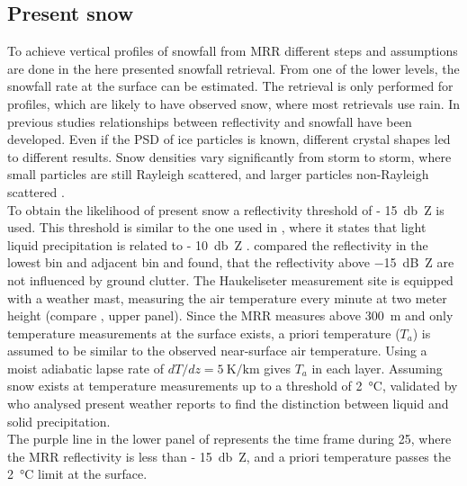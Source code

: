 \subsection{Present snow}\label{sec:pre_snow}

To achieve vertical profiles of snowfall from MRR different steps and assumptions are done in the here presented snowfall retrieval. From one of the lower levels, the snowfall rate at the surface can be estimated. The retrieval is only performed for profiles, which are likely to have observed snow, where most retrievals use rain. In previous studies relationships between reflectivity and snowfall have been developed. Even if the PSD of ice particles is known, different crystal shapes led to different results. Snow densities vary significantly from storm to storm, where small particles are still Rayleigh scattered, and larger particles non-Rayleigh scattered \citep{gunn_microwave_1954}. 
\\
To obtain the likelihood of present snow a reflectivity threshold of \SI{- 15}{\decibel Z} is used. This threshold is similar to the one used in \cite{wood_level_2013}, where it states that light liquid precipitation is related to \SI{- 10}{\decibel Z} \citep{stephens_properties_2007}. \cite{wood_estimation_2011} compared the reflectivity in the lowest bin and adjacent bin and found, that the reflectivity above \SI{-15}{\dB Z} are not influenced by ground clutter.
\newline
The Haukeliseter measurement site is equipped with a weather mast, measuring the air temperature every minute at two meter height (compare , upper panel). 
%
Since the MRR measures above \SI{300}{\metre} and only temperature measurements at the surface exists, a priori temperature ($T_{a}$) is assumed to be similar to the observed near-surface air temperature. Using a moist adiabatic lapse rate of $dT/dz = \SI{5}{\kelvin\per\km}$ gives $T_{a}$ in each layer. 
Assuming snow exists at temperature measurements up to a threshold of \SI{2}{\celsius}, validated by \cite{liu_g._deriving_2008} who analysed present weather reports to find the distinction between liquid and solid precipitation.\\
The purple line in the lower panel of  represents the time frame during \SI{25}{\dec}, where the MRR reflectivity is less than \SI{- 15}{\decibel Z}, and a priori temperature passes the \SI{2}{\celsius} limit at the surface.  


